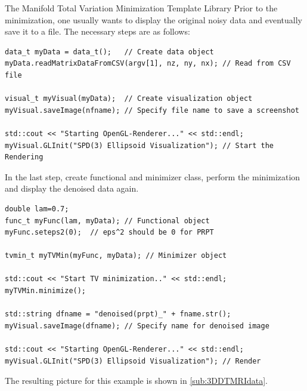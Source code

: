 \begin{chapter}{The Manifold Total Variation Minimization Template Library}
Prior to the minimization, one usually wants to display the original noisy data and eventually save it to a file. The necessary steps are as follows:\\

\cppinline
\begin{lstlisting}[label=code:tut3_rendernoisyimg,caption={Data input and displaying the noisy data}]
data_t myData = data_t();   // Create data object
myData.readMatrixDataFromCSV(argv[1], nz, ny, nx); // Read from CSV file

visual_t myVisual(myData);  // Create visualization object
myVisual.saveImage(nfname); // Specify file name to save a screenshot

std::cout << "Starting OpenGL-Renderer..." << std::endl;
myVisual.GLInit("SPD(3) Ellipsoid Visualization"); // Start the Rendering
\end{lstlisting}

In the last step, create functional and minimizer class, perform the minimization and display the denoised data again.

\cppinline
\begin{lstlisting}[label=code:tut3_rendernoisyimg,caption={Minimization and final rendering}]
double lam=0.7;
func_t myFunc(lam, myData); // Functional object
myFunc.seteps2(0);  // eps^2 should be 0 for PRPT

tvmin_t myTVMin(myFunc, myData); // Minimizer object

std::cout << "Start TV minimization.." << std::endl;
myTVMin.minimize();

std::string dfname = "denoised(prpt)_" + fname.str();
myVisual.saveImage(dfname); // Specify name for denoised image

std::cout << "Starting OpenGL-Renderer..." << std::endl;
myVisual.GLInit("SPD(3) Ellipsoid Visualization"); // Render
\end{lstlisting}

The resulting picture for this example is shown in \ref{sub:3DDTMRIdata}.







\end{chapter}
